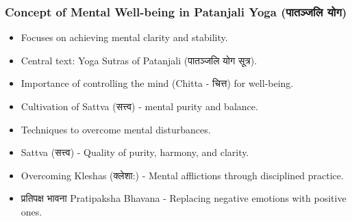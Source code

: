 
\begin{frame}[fragile]\frametitle{Concept of Mental Well-being in Patanjali Yoga (पातञ्जलि योग)}

      \begin{itemize}
		\item Focuses on achieving mental clarity and stability.
		\item Central text: Yoga Sutras of Patanjali (पातञ्जलि योग सूत्र).
		\item Importance of controlling the mind (Chitta - चित्त) for well-being.
		\item Cultivation of Sattva (सत्त्व) - mental purity and balance.
		\item Techniques to overcome mental disturbances.
		\item Sattva (सत्त्व) - Quality of purity, harmony, and clarity.
		\item Overcoming Kleshas (क्लेशा:) - Mental afflictions through disciplined practice.
		\item प्रतिपक्ष भावना Pratipaksha Bhavana - Replacing negative emotions with positive ones.		
	  \end{itemize}

\end{frame}

